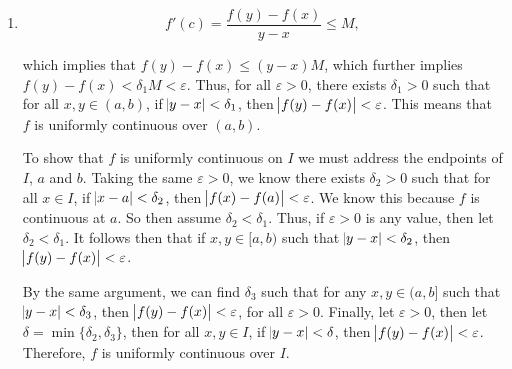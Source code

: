 \documentclass[12pt]{article}
\makeatletter
\theoremstyle{definition}
\theoremstyle{remark}
\renewenvironment{proof}[1][\proofname]{\par
  \pushQED{\qed}%
  \normalfont \topsep6\p@\@plus6\p@\relax
  \list{}{\leftmargin=0mm
          \rightmargin=0mm
          \settowidth{\itemindent}{\itshape#1}%
          \labelwidth=\itemindent
          \parsep=0pt \listparindent=\parindent 
  }
  \item[\hskip\labelsep
        \itshape
    #1\@addpunct{.}]\ignorespaces
}{%
  \popQED\endlist\@endpefalse
}
\let\oldproofname=\proofname
\renewcommand{\proofname}{\bf{\textit{\oldproofname}}}
\makeatother
\begin{document}
\begin{enumerate}[leftmargin=*]
\begin{proof}
        \begin{equation*}
            f'(c)=\frac{f(y)-f(x)}{y-x}\leq M,
        \end{equation*}
        
        \noindent which implies that $f(y)-f(x)\leq(y-x)M$, which further implies $f(y)-f(x)<\delta_1 M<\varepsilon$. Thus, for all $\varepsilon>0$, there exists $\delta_1>0$ such that for all $x,y\in(a,b)$, if $\abs{y-x}<\delta_1$, then $\abs{f(y)-f(x)}<\varepsilon$. This means that $f$ is uniformly continuous over $(a,b)$.\par 
        \hspace{8mm}To show that $f$ is uniformly continuous on $I$ we must address the endpoints of $I$, $a$ and $b$. Taking the same $\varepsilon>0$, we know there exists $\delta_2>0$ such that for all $x\in I$, if $\abs{x-a}<\delta_2$, then $\abs{f(x)-f(a)}<\varepsilon$. We know this because $f$ is continuous at $a$. So then assume $\delta_2<\delta_1$. Thus, if $\varepsilon>0$ is any value, then let $\delta_2<\delta_1$. It follows then that if $x,y\in[a,b)$ such that $\abs{y-x}<\delta_2$, then $\abs{f(y)-f(x)}<\varepsilon$. \par 
        \hspace{8mm}By the same argument, we can find $\delta_3$ such that for any $x,y\in(a,b]$ such that $\abs{y-x}<\delta_3$, then $\abs{f(y)-f(x)}<\varepsilon$, for all $\varepsilon>0$. Finally, let $\varepsilon>0$, then let $\delta=\min\{\delta_2,\delta_3\}$, then for all $x,y\in I$, if $\abs{y-x}<\delta$, then $\abs{f(y)-f(x)}<\varepsilon$. Therefore, $f$ is uniformly continuous over $I$. 
    \end{proof}
              
\end{enumerate}
\end{document}
